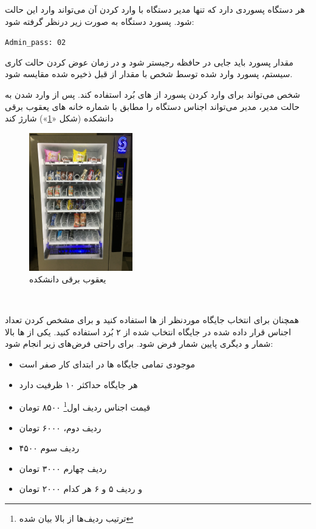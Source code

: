\documentclass[]{article}
\begin{document}
هر دستگاه پسوردی دارد که تنها مدیر دستگاه با وارد کردن آن می‌تواند وارد این حالت شود. پسورد دستگاه به صورت زیر درنظر گرفته شود:

\begin{latin}
	\texttt{Admin\_pass: 02}
\end{latin}



مقدار پسورد باید جایی در حافظه رجیستر شود و در زمان عوض کردن حالت کاری سیستم، پسورد وارد شده توسط شخص با مقدار از قبل ذخیره شده مقایسه شود.

شخص می‌تواند برای وارد کردن پسورد از  های بُرد استفاده کند. پس از وارد شدن به حالت مدیر، مدیر می‌تواند اجناس دستگاه را مطابق با شماره خانه های یعقوب برقی دانشکده (شکل «\textcolor{blue}{\ref{یعقوب برقی دانشکده}}») شارژ کند



\begin{figure}[h]
	\centering
	\includegraphics[width=0.4\textwidth]{images/img2.jpg}
	\caption{یعقوب برقی دانشکده}
	\label{یعقوب برقی دانشکده}
\end{figure}

\newpage
\Large \textbf{\\
}

همچنان برای انتخاب جایگاه موردنظر از  ها استفاده کنید و برای مشخص کردن تعداد اجناس قرار داده شده در جایگاه انتخاب شده از ۲  بُرد استفاده کنید. یکی از  ها بالا شمار و دیگری پایین شمار فرض شود. برای راحتی فرض‌های زیر انجام شود:

\begin{itemize}
	\item موجودی تمامی جایگاه ها در ابتدای کار صفر است
	\item هر جایگاه حداکثر ۱۰ ظرفیت دارد
	\item قیمت اجناس ردیف اول\footnote{ترتیب ردیف‌ها از بالا بیان شده} ۸۵۰۰ تومان
	\item ردیف دوم، ۶۰۰۰ تومان
	\item ردیف سوم ۴۵۰۰
	\item ردیف چهارم ۳۰۰۰ تومان
	\item و ردیف ۵ و ۶ هر کدام ۲۰۰۰ تومان
\end{itemize}
\end{document}

